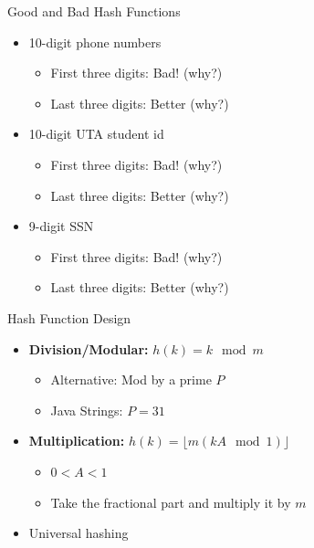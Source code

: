 \documentclass{beamer}
\begin{document}
\begin{frame}{Good and Bad Hash Functions}
    \begin{itemize}
        \item 10-digit phone numbers
        \begin{itemize}
            \item First three digits: \pause Bad! (why?)
            \item Last three digits: \pause Better (why?)
        \end{itemize} 
        \item 10-digit UTA student id 
        \begin{itemize}
            \item First three digits: Bad! (why?)
            \item Last three digits: Better (why?)
        \end{itemize} 
        \item 9-digit SSN
        \begin{itemize}
            \item First three digits: \pause Bad! (why?)
            \item Last three digits: \pause Better (why?)
        \end{itemize} 
    \end{itemize}
\end{frame}

\begin{frame}{Hash Function Design}
    \begin{itemize}
        \item {\bf Division/Modular:} $h(k) = k \mod m$  
        \begin{itemize}
            \item Alternative: Mod by a prime $P$
            \item Java Strings: $P=31$
        \end{itemize} 
        \item {\bf Multiplication:} $h(k) = \lfloor m(kA \mod 1) \rfloor$  
        \begin{itemize}
            \item $0 < A < 1$
            \item Take the fractional part and multiply it by $m$
        \end{itemize} 
        \item Universal hashing
    \end{itemize}
\end{frame}
\end{document}
